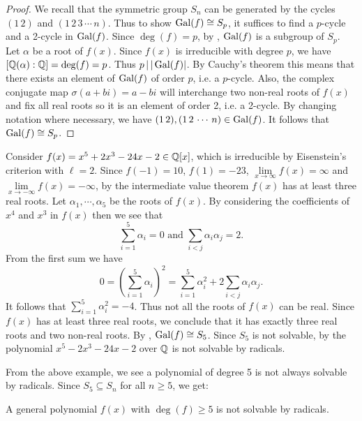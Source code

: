 \documentclass[11pt]{article}
\begin{document}
\begin{proof}
    We recall that the symmetric group $S_n$ can be generated by the cycles $(1\,2)$ and $(1\,2\,3\,\cdots\,n)$. Thus to show $\operatorname{Gal}(f)\cong S_p$, it suffices to find a $p$-cycle and a 2-cycle in $\operatorname{Gal}(f)$. Since $\deg(f)=p$, by , $\operatorname{Gal}(f)$ is a subgroup of $S_p$. Let $\alpha$ be a root of $f(x)$. Since $f(x)$ is irreducible with degree $p$, we have $[\mathbb{Q}(\alpha):\mathbb{Q}]=\deg(f)=p$. Thus $p\,|\,|\operatorname{Gal}(f)|$. By Cauchy's theorem this means that there exists an element of $\operatorname{Gal}(f)$ of order $p$, i.e. a $p$-cycle. Also, the complex conjugate map $\sigma(a+bi)=a-bi$ will interchange two non-real roots of $f(x)$ and fix all real roots so it is an element of order 2, i.e. a 2-cycle. By changing notation where necessary, we have $(1\,2),(1\,2\,\cdots\,n)\in\operatorname{Gal}(f)$. It follows that $\operatorname{Gal}(f)\cong S_p$.
    
\end{proof}

\begin{example}
    Consider $f(x)=x^5+2x^3-24x-2\in\mathbb{Q}[x]$, which is irreducible by Eisenstein's criterion with $\ell=2$. Since $f(-1)=10$, $f(1)=-23$, $\lim\limits_{x\to\infty}f(x)=\infty$ and $\lim\limits_{x\to-\infty}f(x)=-\infty$, by the intermediate value theorem $f(x)$ has at least three real roots. Let $\alpha_1,\cdots,\alpha_5$ be the roots of $f(x)$. By considering the coefficients of $x^4$ and $x^3$ in $f(x)$ then we see that
    \[\sum\limits_{i=1}^5\alpha_i=0\text{ and }\sum\limits_{i<j}\alpha_i\alpha_j=2.\]
    From the first sum we have
    \[0=\left(\sum\limits_{i=1}^5\alpha_i\right)^2=\sum\limits_{i=1}^5\alpha_i^2+2\sum\limits_{i<j}\alpha_i\alpha_j.\]
    It follows that $\sum\limits_{i=1}^5\alpha_i^2=-4$. Thus not all the roots of $f(x)$ can be real. Since $f(x)$ has at least three real roots, we conclude that it has exactly three real roots and two non-real roots. By , $\operatorname{Gal}(f)\cong S_5$. Since $S_5$ is not solvable, by  the polynomial $x^5-2x^3-24x-2$ over $\mathbb{Q}$ is not solvable by radicals.
\end{example}

From the above example, we see a polynomial of degree 5 is not always solvable by radicals. Since $S_5\subseteq S_n$ for all $n\geq 5$, we get:

\begin{theorem}
    A general polynomial $f(x)$ with $\deg(f)\geq 5$ is not solvable by radicals.
\end{theorem}
\end{document}
